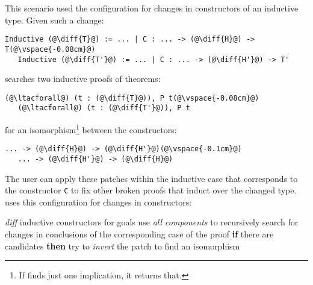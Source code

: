 
This scenario used the configuration for changes in constructors of an inductive type.
Given such a change: %

\begin{lstlisting}[language=coq]
   Inductive (@\diff{T}@) := ... | C : ... -> (@\diff{H}@) -> T(@\vspace{-0.08cm}@)
   Inductive (@\diff{T'}@) := ... | C : ... -> (@\diff{H'}@) -> T'
\end{lstlisting}
\sysname searches two inductive proofs of theorems:

\begin{lstlisting}[language=coq]
   (@\ltacforall@) (t : (@\diff{T}@)), P t(@\vspace{-0.08cm}@)
   (@\ltacforall@) (t : (@\diff{T'}@)), P t
\end{lstlisting}
for an isomorphism\footnote{If \sysname finds just one implication, it returns that.} between the constructors:

\begin{lstlisting}[language=coq]
   ... -> (@\diff{H}@) -> (@\diff{H'}@)(@\vspace{-0.1cm}@)
   ... -> (@\diff{H'}@) -> (@\diff{H}@)
\end{lstlisting}

The user can apply these patches within the inductive case that corresponds to the constructor \lstinline{C}
to fix other broken proofs that induct over the changed type. 
\sysname uses this configuration for changes in constructors:

\begin{algorithm}
\footnotesize
\begin{algorithmic}[1]
    \STATE \textit{diff} inductive constructors for goals
    \STATE use \textit{all components} to recursively search for changes in conclusions of the corresponding case of the proof
    \STATE \textbf{if} there are candidates \textbf{then}
    \STATE \hspace*{1em} try to \textit{invert} the patch to find an isomorphism 
\end{algorithmic}
\end{algorithm}

